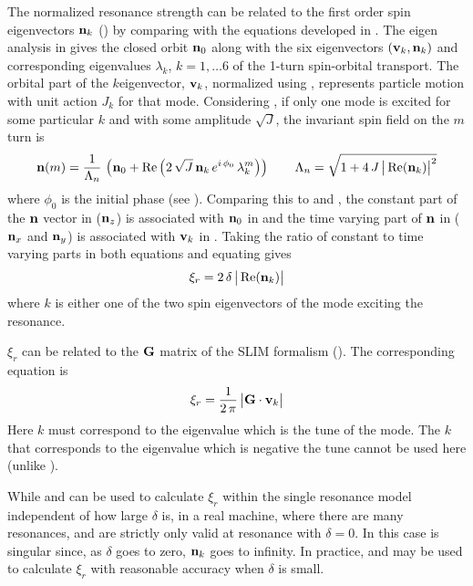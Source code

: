 The normalized resonance strength can be related to the first order spin eigenvectors ${\bf n}_k$
() by comparing  with the equations developed in . The eigen
analysis in  gives the closed orbit ${\bf n}_0$ along with the six eigenvectors
$({\bf v}_k, {\bf n}_k)$ and corresponding eigenvalues $\lambda_k$, $k = 1, \ldots 6$ of the 1-turn
spin-orbital transport. The orbital part of the $k$\Th eigenvector, ${\bf v}_k$, normalized using
, represents particle motion with unit action $J_k$ for that mode. Considering ,
if only one mode is excited for some particular $k$ and with some amplitude $\sqrt{J}$, the
invariant spin field on the $m$\Th turn is
\begin{equation}
  {\bf n}(m) = \frac{1}{\Lambda_n} \, 
  \left( {\bf n}_0 + \operatorname{Re} \left( 2 \, \sqrt{J} \, {\bf n}_k \, e^{i \, \phi_0} \, \lambda_k^m \right) \right)
  \qquad
  \Lambda_n = \sqrt{1 + 4 \, J \, \big| \operatorname{Re}({\bf n}_k) \big|^2}
  \label{nnav}
\end{equation}
where $\phi_0$ is the initial phase (see ). Comparing this to  and , the
constant part of the ${\bf n}$ vector in  (${\bf n}_z$) is associated with ${\bf n}_0$ in 
and the time varying part of ${\bf n}$ in  (${\bf n}_x$ and ${\bf n}_y$) is associated with ${\bf v}_k$
in . Taking the ratio of constant to time varying parts in both equations and equating
gives
\begin{equation}
  \xi_r = 2 \, \delta \, \big| \operatorname{Re}({\bf n}_k) \big|
  \label{x2dn}
\end{equation}
where $k$ is either one of the two spin eigenvectors of the mode exciting the resonance.

$\xi_r$ can be related to the ${\bf G}$ matrix of the SLIM formalism (). The corresponding equation
is\cite{b:spin.hoff}
\begin{equation}
  \xi_r = \frac{1}{2 \, \pi} \, \big| {\bf G} \cdot {\bf v}_k \big|
  \label{x1pg}
\end{equation}
Here $k$ must correspond to the eigenvalue which is the tune of the mode. The $k$ that corresponds to the
eigenvalue which is negative the tune cannot be used here (unlike ).

While  and  can be used to calculate $\xi_r$ within the single resonance model
independent of how large $\delta$ is, in a real machine, where there are many resonances, 
and  are strictly only valid at resonance with $\delta = 0$. In this case  is
singular since, as $\delta$ goes to zero, ${\bf n}_k$ goes to infinity. In practice,  and
 may be used to calculate $\xi_r$ with reasonable accuracy when $\delta$ is small.


